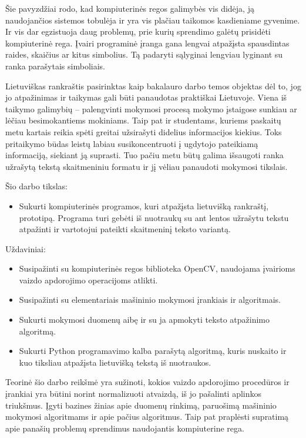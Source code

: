 \documentclass[a4paper,12pt]{article}
\begin{document}
Šie pavyzdžiai rodo, kad kompiuterinės regos galimybės vis didėja, ją naudojančios sistemos tobulėja ir yra vis plačiau taikomos kasdieniame gyvenime. Ir vis dar egzistuoja daug problemų, prie kurių sprendimo galėtų prisidėti kompiuterinė rega. Įvairi programinė įranga gana lengvai atpažįsta spausdintas raides, skaičius ar kitus simbolius. Tą padaryti sąlyginai lengviau lyginant su ranka parašytais simboliais.

Lietuviškas rankraštis pasirinktas kaip bakalauro darbo temos objektas dėl to, jog jo atpažinimas ir taikymas gali būti panaudotas praktiškai Lietuvoje. Viena iš taikymo galimybių – palengvinti mokymosi procesą mokymo įstaigose sunkiau ar lėčiau besimokantiems mokiniams. Taip pat ir studentams, kuriems paskaitų metu kartais reikia spėti greitai užsirašyti didelius informacijos kiekius. Toks pritaikymo būdas leistų labiau susikoncentruoti į ugdytojo pateikiamą informaciją, siekiant ją suprasti. Tuo pačiu metu būtų galima išsaugoti ranka užrašytą tekstą skaitmeniniu formatu ir jį vėliau panaudoti mokymosi tikslais.

Šio darbo tikslas:
\begin{itemize}
	\item Sukurti kompiuterinės programos, kuri atpažįsta lietuvišką rankraštį, prototipą. Programa turi gebėti iš nuotraukų su ant lentos užrašytu tekstu atpažinti ir vartotojui pateikti skaitmeninį teksto variantą.
\end{itemize}

Uždaviniai:
\begin{itemize}
	\item Susipažinti su kompiuterinės regos biblioteka OpenCV, naudojama įvairioms vaizdo apdorojimo operacijoms atlikti.
	\item Susipažinti su elementariais mašininio mokymosi įrankiais ir algoritmais.
	\item Sukurti mokymosi duomenų aibę ir su ja apmokyti teksto atpažinimo algoritmą.
	\item Sukurti Python programavimo kalba parašytą algoritmą, kuris nuskaito ir kuo tiksliau atpažįsta lietuvišką tekstą iš nuotraukos.
\end{itemize}

Teorinė šio darbo reikšmė yra sužinoti, kokios vaizdo apdorojimo procedūros ir įrankiai yra būtini norint normalizuoti atvaizdą, iš jo pašalinti aplinkos triukšmus. Įgyti bazines žinias apie duomenų rinkimą, paruošimą mašininio mokymosi algoritmams ir apie pačius algoritmus. Taip pat praplėsti supratimą apie panašių problemų sprendimus naudojantis kompiuterine rega.
\end{document}
